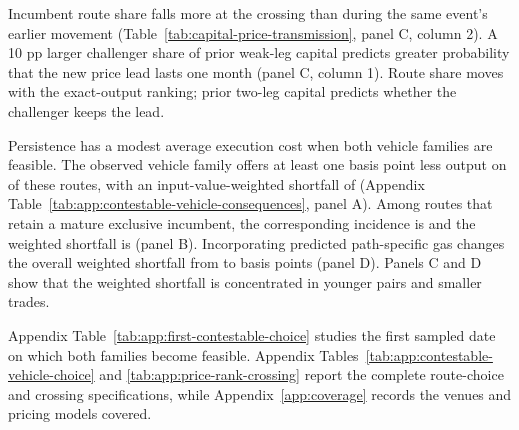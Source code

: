 Incumbent route share falls \RankCrossingPlaceboDrop{} more at the crossing than during the same event's earlier movement (Table~\ref{tab:capital-price-transmission}, panel C, column 2). A 10 pp larger challenger share of prior weak-leg capital predicts \RankCrossingCapitalPersistence{} greater probability that the new price lead lasts one month (panel C, column 1). Route share moves with the exact-output ranking; prior two-leg capital predicts whether the challenger keeps the lead.

Persistence has a modest average execution cost when both vehicle families are feasible. The observed vehicle family offers at least one basis point less output on \ContestLowerOutputFamilyShare{} of these routes, with an input-value-weighted shortfall of \ContestForegoneInputValueWeightedBps{} (Appendix Table~\ref{tab:app:contestable-vehicle-consequences}, panel A). Among routes that retain a mature exclusive incumbent, the corresponding incidence is \ContestRetainedLowerOutputShare{} and the weighted shortfall is \ContestRetainedForegoneInputValueWeightedBps{} (panel B). Incorporating predicted path-specific gas changes the overall weighted shortfall from \GasConsequenceOverallGrossShortfallBp{} to \GasConsequenceOverallNetShortfallBp{} basis points (panel D). Panels C and D show that the weighted shortfall is concentrated in younger pairs and smaller trades.

Appendix Table~\ref{tab:app:first-contestable-choice} studies the first sampled date on which both families become feasible. Appendix Tables~\ref{tab:app:contestable-vehicle-choice} and \ref{tab:app:price-rank-crossing} report the complete route-choice and crossing specifications, while Appendix~\ref{app:coverage} records the venues and pricing models covered.

